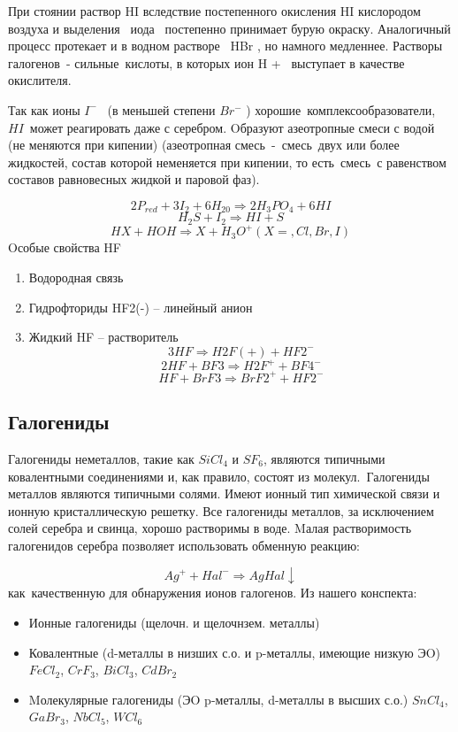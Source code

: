 \documentclass[11pt]{article}
\begin{document}
При стоянии раствор HI вследствие постепенного окисления HI кислородом воздуха и
выделения  иода  постепенно принимает бурую окраску.
Аналогичный процесс протекает и в водном растворе  HBr , но намного медленнее.
Растворы галогенов - сильные кислоты, в которых ион H +  выступает в качестве окислителя.

Так как ионы $I^-$  (в меньшей степени $Br^-$ ) хорошие комплексообразователи, $HI$ может реагировать даже с серебром.
Oбразуют азеотропные смеси с водой (не меняются при кипении) (азеотропная смесь - смесь двух или более жидкостей, состав которой неменяется при кипении, то есть смесь с равенством составов равновесных жидкой
и паровой фаз).

$$2P_{red}+3I_2+6H_20 \Rightarrow 2H_3PO_4+6HI$$
$$H_2S+I_2\Rightarrow  HI+S$$
$$HX+HOH\Rightarrow X+H_3O^+ (X=, Cl, Br, I)$$
Oсобые свойства HF
\begin{enumerate}
\item Водородная связь
\item Гидрофториды HF2(-) – линейный анион
\item Жидкий HF – растворитель
$$3HF \Rightarrow H2F(+)+HF2^-$$
$$2HF+BF3\Rightarrow H2F^++BF4^-$$
$$HF+BrF3\Rightarrow BrF2^++HF2^-$$
\end{enumerate}
\subsection{Галогениды}

Галогениды неметаллов, такие как $SiCl_4$ и $SF_6$, являются типичными ковалентными соединениями
и, как правило, состоят из молекул. Галогениды металлов являются типичными солями. Имеют
ионный тип химической связи и ионную кристаллическую решетку.
Все галогениды металлов, за исключением солей серебра и свинца, хорошо растворимы в воде.
Mалая растворимость галогенидов серебра позволяет использовать обменную реакцию:

$$Ag^+ +Hal^- \Rightarrow AgHal\downarrow$$
как качественную для обнаружения ионов галогенов.
Из нашего конспекта:
\begin{itemize}
\item Ионные галогениды (щелочн. и щелочнзем. металлы)
\item Ковалентные (d-металлы в низших с.о. и p-металлы, имеющие низкую ЭO)
$FeCl_2$, $CrF_3$, $BiCl_3$, $CdBr_2$
\item Mолекулярные галогениды (ЭO p-металлы, d-металлы в высших с.о.)
$SnCl_4$, $GaBr_3$, $NbCl_5$, $WCl_6$
\end{itemize}
\end{document}
